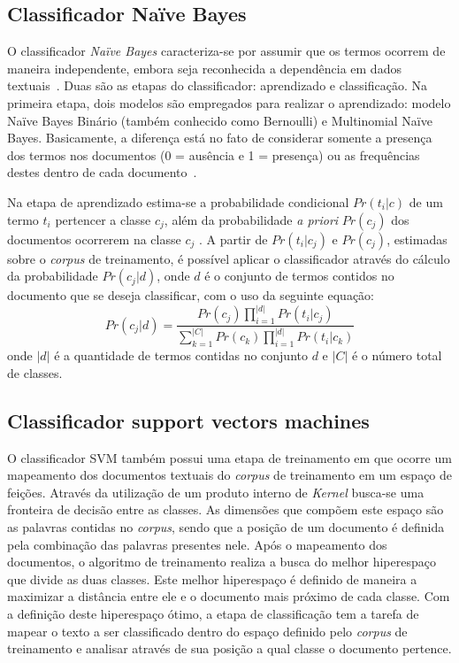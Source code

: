 \documentclass[11pt,a4paper]{article}
\begin{document}
\subsection{Classificador Naïve Bayes}

 O classificador \textit{Naïve Bayes} caracteriza-se por assumir que os termos ocorrem de maneira independente, embora seja reconhecida a dependência em dados textuais~\cite{Manning:IR}. Duas são as etapas do classificador: aprendizado e classificação. Na primeira etapa, dois modelos são empregados para realizar o aprendizado: modelo Naïve Bayes Binário (também conhecido como Bernoulli) e Multinomial Naïve Bayes. Basicamente, a diferença está no fato de considerar somente a presença dos termos nos documentos (0 = ausência e 1 = presença) ou as frequências destes dentro de cada documento~\cite{Manning:IR}.

Na etapa de aprendizado estima-se a probabilidade condicional $Pr(t_i|c)$ de um termo $t_i$ pertencer a classe $c_j$, além da probabilidade \textit{a priori} $Pr(c_j)$ dos documentos ocorrerem na classe $c_j$ \cite{Liu:dataMining}. A partir de $Pr(t_i|c_j)$ e $Pr(c_j)$, estimadas sobre o \textit{corpus} de treinamento, é possível aplicar o classificador através do cálculo da probabilidade $Pr(c_j|d)$, onde $d$ é o conjunto de termos contidos no documento que se deseja classificar, com o uso da seguinte equação:
\begin{equation}
Pr(c_j|d) = \frac{{Pr(c_j)\prod_{i=1}^{|d|} Pr(t_i|c_j)}}{\sum_{k=1}^{|C|} Pr(c_k)\prod_{i=1}^{|d|} Pr(t_i|c_k)}
\end{equation}
onde $|d|$ é a quantidade de termos contidas no conjunto $d$ e $|C|$ é o número total de classes.

\subsection{Classificador support vectors machines}

O classificador SVM também possui uma etapa de treinamento em que ocorre um mapeamento dos documentos textuais do \textit{corpus} de treinamento em um espaço de feições. Através da utilização de um produto interno de \textit{Kernel} busca-se uma fronteira de decisão entre as classes. As dimensões que compõem este espaço são as palavras contidas no \textit{corpus}, sendo que a posição de um documento é definida pela combinação das palavras presentes nele. Após o mapeamento dos documentos, o algoritmo de treinamento realiza a busca do melhor hiperespaço que divide as duas classes. Este melhor hiperespaço é definido de maneira a maximizar a distância entre ele e o documento mais próximo de cada classe. Com a definição deste hiperespaço ótimo, a etapa de classificação tem a tarefa de mapear o texto a ser classificado dentro do espaço definido pelo \textit{corpus} de treinamento e analisar através de sua posição a qual classe o documento pertence\cite{Liu:dataMining}.
\end{document}
